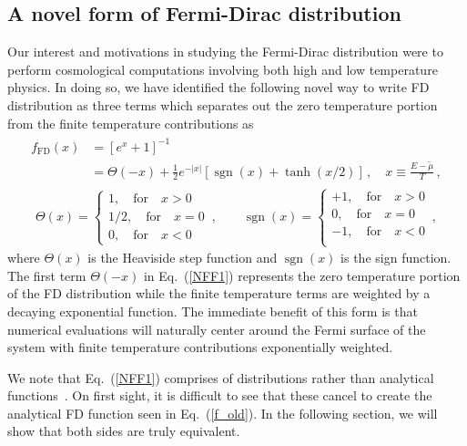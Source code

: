 \documentclass[sn-mathphys,Numbered]{sn-jnl}
\newcommand{\req}[1]{Eq.~(\ref{#1})}
\DeclareMathOperator{\sgn}{sgn}
\begin{document}
\subsection{A novel form of Fermi-Dirac distribution}
\label{Novel}
Our interest and motivations in studying the Fermi-Dirac distribution were to perform cosmological computations involving both high and low temperature physics. In doing so, we have identified the following novel way to write FD distribution as three terms which separates out the zero temperature portion from the finite temperature contributions as 
\begin{align}
\label{NFF1}
\begin{split}
f_\mathrm{FD}(x)
&=\left[e^{x}+1\right]^{-1}\\
&=\Theta(-x)+\frac{1}{2}e^{-|x|}\left[\sgn(x)+\tanh(x/2)\right]\,,\quad
x\equiv\frac{E-\widetilde\mu}{T}\,,
\end{split}
\end{align}
\begin{align}
\label{NFF2}
\Theta(x)=\left\{
\begin{array}{r}
1,\quad\mathrm{for}\quad{x}>0\\
1/2,\quad\mathrm{for}\quad{x}=0\\
0,\quad\mathrm{for}\quad{x}<0
\end{array}\right.\,,\qquad
\sgn(x)=\left\{
\begin{array}{r}
+1,\quad\mathrm{for}\quad{x}>0\\
0,\quad\mathrm{for}\quad{x}=0\\
-1,\quad\mathrm{for}\quad{x}<0\\
\end{array}\right.\,,
\end{align}
where $\Theta(x)$ is the Heaviside step function and $\sgn(x)$ is the sign function. The first term $\Theta(-x)$ in \req{NFF1} represents the zero temperature portion of the FD distribution while the finite temperature terms are weighted by a decaying exponential function. The immediate benefit of this form is that numerical evaluations will naturally center around the Fermi surface of the system with finite temperature contributions exponentially weighted.

We note that \req{NFF1} comprises of distributions rather than analytical functions~\cite{Arfken:2011abc}. On first sight, it is difficult to see that these cancel to create the analytical FD function seen in \req{f_old}. In the following section, we will show that both sides are truly equivalent.
\end{document}
